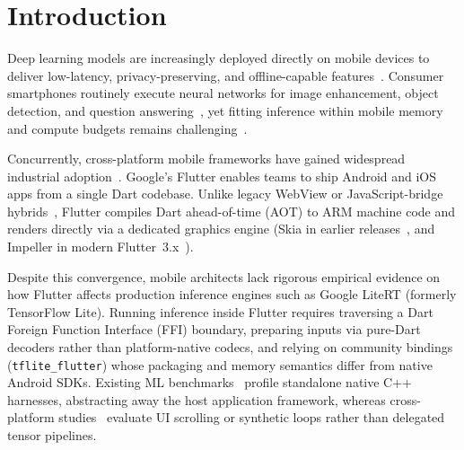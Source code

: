 \section{Introduction}\label{sec:intro}

Deep learning models are increasingly deployed directly on mobile devices to deliver low-latency, privacy-preserving, and offline-capable features~\cite{xu2019first,lane2015early}. Consumer smartphones routinely execute neural networks for image enhancement, object detection, and question answering~\cite{almeida2021smart,wu2019machine}, yet fitting inference within mobile memory and compute budgets remains challenging~\cite{lane2016deepx,banbury2020benchmarking}.

Concurrently, cross-platform mobile frameworks have gained widespread industrial adoption~\cite{biornhansen2019survey,stackoverflow2024survey}. Google's Flutter enables teams to ship Android and iOS apps from a single Dart codebase. Unlike legacy WebView or JavaScript-bridge hybrids~\cite{ciman2017empirical,delia2015multi}, Flutter compiles Dart ahead-of-time (AOT) to ARM machine code and renders directly via a dedicated graphics engine (Skia in earlier releases~\cite{biornhansen2020empirical}, and Impeller in modern Flutter~3.x~\cite{flutterimpeller2025}).

Despite this convergence, mobile architects lack rigorous empirical evidence on how Flutter affects production inference engines such as Google LiteRT (formerly TensorFlow Lite). Running inference inside Flutter requires traversing a Dart Foreign Function Interface (FFI) boundary, preparing inputs via pure-Dart decoders rather than platform-native codecs, and relying on community bindings (\texttt{tflite\_flutter}) whose packaging and memory semantics differ from native Android SDKs. Existing ML benchmarks~\cite{ignatov2018ai,ignatov2019ai,reddi2022mlperfmobile,zhang2022comprehensive} profile standalone native C++ harnesses, abstracting away the host application framework, whereas cross-platform studies~\cite{biornhansen2020empirical,willocx2016comparing} evaluate UI scrolling or synthetic loops rather than delegated tensor pipelines.

